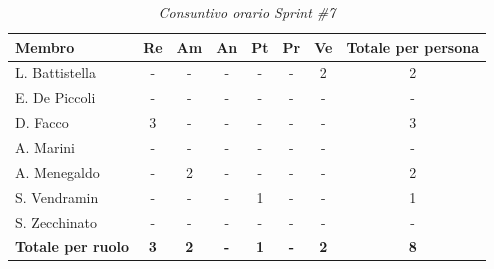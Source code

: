 \documentclass[a4paper, 10pt, colorlinks=true, linkcolor=black, urlcolor=blue, citecolor=blue, hidelinks]{article}
\renewcommand{\arraystretch}{1.2}
\begin{document}
\begin{table}[H]
    \centering
    \renewcommand{\arraystretch}{1.4}
    \begin{tabular}{|l|c|c|c|c|c|c|c|}
        \hline
        \rowcolor{bluBitless!15}
        \textbf{Membro} & \textbf{Re} & \textbf{Am} & \textbf{An} & \textbf{Pt} & \textbf{Pr} & \textbf{Ve} & \textbf{Totale per persona} \\
        \hline
        L. Battistella & - & - & - & - & - & 2 & 2 \\ \hline
        E. De Piccoli & - & - & - & - & - & - & - \\ \hline
        D. Facco & 3 & - & - & - & - & - & 3 \\ \hline
        A. Marini & - & - & - & - & - & - & - \\ \hline
        A. Menegaldo & - & 2 & - & - & - & - & 2 \\ \hline
        S. Vendramin & - & - & - & 1 & - & - & 1 \\ \hline
        S. Zecchinato & - & - & - & - & - & - & - \\ \hline
        \rowcolor{bluBitless!8}
        \textbf{Totale per ruolo} & \textbf{3} & \textbf{2} & \textbf{-} & \textbf{1} & \textbf{-} & \textbf{2} & \textbf{8} \\
        \hline
    \end{tabular}
    \caption{\textit{Consuntivo orario Sprint \#7}}
\end{table}
\end{document}
